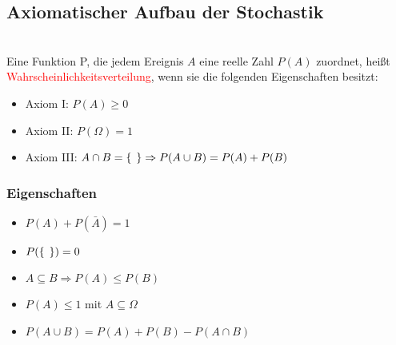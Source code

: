 \documentclass[a4paper,twocolumn,10pt]{onepgnote1}
\begin{document}
\subsection{Axiomatischer Aufbau der Stochastik}\\
Eine Funktion P, die jedem Ereignis $A$ eine reelle Zahl $P(A)$ zuordnet, heißt \textcolor{red}{Wahrscheinlichkeitsverteilung}, wenn sie die folgenden Eigenschaften besitzt: 
\begin{itemize}
    \item Axiom I: $P(A) \geq 0$ 
    \item Axiom II: $P(\Omega) = 1$ 
    \item Axiom III: $A\cap B = \{ \hspace{0.15cm} \} \Rightarrow P(A\cup B) = P(A) + P(B)$ 
\end{itemize}
\subsubsection{Eigenschaften}
\begin{itemize}
    \item $P(A) + P(\bar{A}) = 1$
    \item $P(\{ \hspace{0.15cm} \}) = 0 $
    \item $A\subseteq B \Rightarrow  P(A) \leq P(B)$
    \item $P(A) \leq 1$ mit $A\subseteq \Omega$
    \item $P(A \cup B) = P(A) + P(B) - P(A\cap B)$
\end{itemize}
\end{document}
